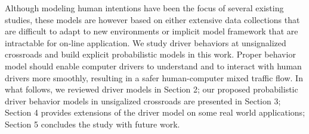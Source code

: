 Although modeling human intentions have been the focus of several existing studies, these models are however based on either extensive data collections that are difficult to adapt to new environments or implicit model framework that are intractable for on-line application. We study driver behaviors at unsignalized crossroads and build explicit probabilistic models in this work. Proper behavior model should enable computer drivers to understand and to interact with human drivers more smoothly, resulting in a safer human-computer mixed traffic flow. In what follows, we reviewed driver models in Section 2; our proposed probabilistic driver behavior models in unsigalized crossroads are presented in Section 3; Section 4 provides extensions of the driver model on some real world applications; Section 5 concludes the study with future work. 



        
        



